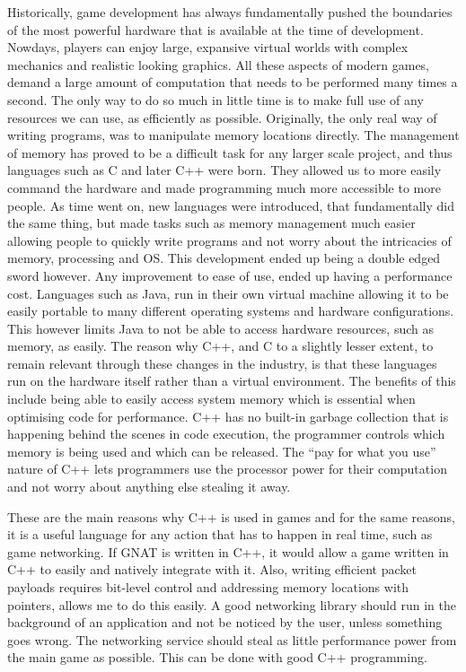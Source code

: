 Historically, game development has always fundamentally pushed the boundaries of the most powerful hardware that is available at the time of development. Nowdays, players can enjoy large, expansive virtual worlds with complex mechanics and realistic looking graphics. All these aspects of modern games, demand a large amount of computation that needs to be performed many times a second. The only way to do so much in little time is to make full use of any resources we can use, as efficiently as possible. Originally, the only real way of writing programs, was to manipulate memory locations directly. The management of memory has proved to be a difficult task for any larger scale project, and thus languages such as C and later C++ were born. They allowed us to more easily command the hardware and made programming much more accessible to more people. As time went on, new languages were introduced, that fundamentally did the same thing, but made tasks such as memory management much easier allowing people to quickly write programs and not worry about the intricacies of memory, processing and OS. This development ended up being a double edged sword however. Any improvement to ease of use, ended up having a performance cost. Languages such as Java, run in their own virtual machine allowing it to be easily portable to many different operating systems and hardware configurations. This however limits Java to not be able to access hardware resources, such as memory, as easily. The reason why C++, and C to a slightly lesser extent, to remain relevant through these changes in the industry, is that these languages run on the hardware itself rather than a virtual environment. The benefits of this include being able to easily access system memory which is essential when optimising code for performance. C++ has no built-in garbage collection that is happening behind the scenes in code execution, the programmer controls which memory is being used and which can be released. The ``pay for what you use'' nature of C++ lets programmers use the processor power for their computation and not worry about anything else stealing it away.

These are the main reasons why C++ is used in games and for the same reasons, it is a useful language for any action that has to happen in real time, such as game networking. If GNAT is written in C++, it would allow a game written in C++ to easily and natively integrate with it. Also, writing efficient packet payloads requires bit-level control and addressing memory locations with pointers, allows me to do this easily. A good networking library should run in the background of an application and not be noticed by the user, unless something goes wrong. The networking service should steal as little performance power from the main game as possible. This can be done with good C++ programming.



